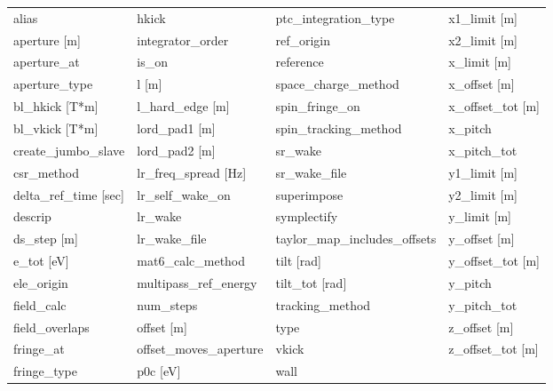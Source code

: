  \begin{tabular}{llll} \toprule
alias                          & hkick                          & ptc_integration_type           & x1_limit [m]                   \\
aperture [m]                   & integrator_order               & ref_origin                     & x2_limit [m]                   \\
aperture_at                    & is_on                          & reference                      & x_limit [m]                    \\
aperture_type                  & l [m]                          & space_charge_method            & x_offset [m]                   \\
bl_hkick [T*m]                 & l_hard_edge [m]                & spin_fringe_on                 & x_offset_tot [m]               \\
bl_vkick [T*m]                 & lord_pad1 [m]                  & spin_tracking_method           & x_pitch                        \\
create_jumbo_slave             & lord_pad2 [m]                  & sr_wake                        & x_pitch_tot                    \\
csr_method                     & lr_freq_spread [Hz]            & sr_wake_file                   & y1_limit [m]                   \\
delta_ref_time [sec]           & lr_self_wake_on                & superimpose                    & y2_limit [m]                   \\
descrip                        & lr_wake                        & symplectify                    & y_limit [m]                    \\
ds_step [m]                    & lr_wake_file                   & taylor_map_includes_offsets    & y_offset [m]                   \\
e_tot [eV]                     & mat6_calc_method               & tilt [rad]                     & y_offset_tot [m]               \\
ele_origin                     & multipass_ref_energy           & tilt_tot [rad]                 & y_pitch                        \\
field_calc                     & num_steps                      & tracking_method                & y_pitch_tot                    \\
field_overlaps                 & offset [m]                     & type                           & z_offset [m]                   \\
fringe_at                      & offset_moves_aperture          & vkick                          & z_offset_tot [m]               \\
fringe_type                    & p0c [eV]                       & wall                           &                                \\
 \bottomrule
 \end{tabular}
 \vfill
 
